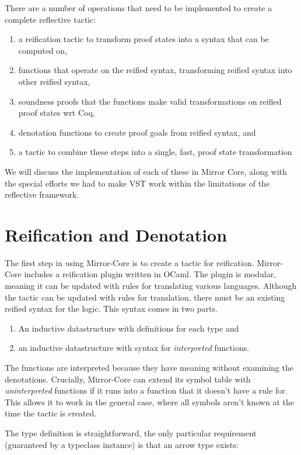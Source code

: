 \documentclass{puthesis}
\begin{document}
There are a number of operations that need to be implemented to create
a complete reflective tactic: 
\begin{enumerate}
\item a reification tactic to transform proof states into a
  syntax that can be computed on,
\item functions that operate on the reified syntax, transforming
  reified syntax into other reified syntax,
\item soundness proofs that the functions make valid transformations
  on reified proof states wrt Coq,
\item denotation functions to create proof goals from reified syntax,
  and
\item a tactic to combine these steps into a single, fast, proof state
  transformation
\end{enumerate}

We will discuss the implementation of each of these in Mirror Core,
along with the special efforts we had to make VST work within the
limitations of the reflective framework.

\section{Reification and Denotation}

The first step in using Mirror-Core is to create a tactic for
reification. Mirror-Core includes a reification plugin written in
OCaml. The plugin is modular, meaning it can be updated with rules for
translating various languages. Although the tactic can be updated with
rules for translation, there must be an existing reified syntax for
the logic. This syntax comes in two parts.

\begin{enumerate}
\item An inductive datastructure with definitions for each type and
\item an inductive datastructure with syntax for \emph{interpreted}
  functions.
\end{enumerate}

The functions are interpreted because they have meaning without
examining the denotations. Crucially, Mirror-Core can extend its
symbol table with \emph{uninterpreted} functions if it runs into a
function that it doesn't have a rule for. This allows it to work in
the general case, where all symbols aren't known at the time the
tactic is created. 

The type definition is straightforward, the only particular
requirement (guaranteed by a typeclass instance) is that an arrow type
exists:
\end{document}

